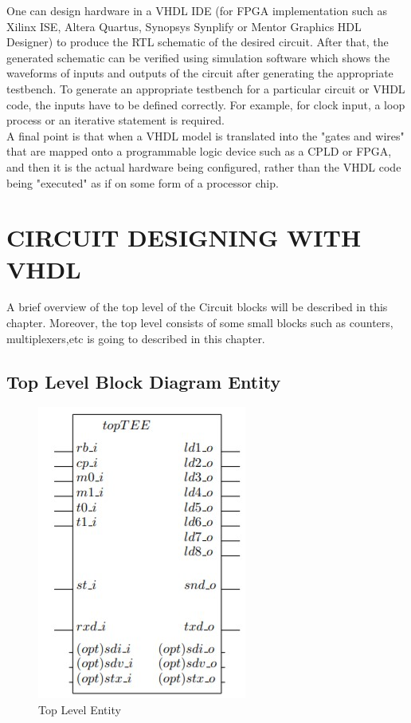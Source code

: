 \documentclass[12pt,a4paper]{article}
\begin{document}
One can design hardware in a VHDL IDE (for FPGA implementation such as Xilinx ISE, Altera Quartus, Synopsys Synplify or Mentor Graphics HDL Designer) to produce the RTL schematic of the desired circuit. After that, the generated schematic can be verified using simulation software which shows the waveforms of inputs and outputs of the circuit after generating the appropriate testbench. To generate an appropriate testbench for a particular circuit or VHDL code, the inputs have to be defined correctly. For example, for clock input, a loop process or an iterative statement is required.\\

A final point is that when a VHDL model is translated into the "gates and wires" that are mapped onto a programmable logic device such as a CPLD or FPGA, and then it is the actual hardware being configured, rather than the VHDL code being "executed" as if on some form of a processor chip.\\





\newpage

\renewcommand{\baselinestretch}{1.5} %
\section{CIRCUIT DESIGNING WITH VHDL}
A brief overview of the top level of the Circuit blocks will be described in this chapter. Moreover, the top level consists of some small blocks such as counters, multiplexers,etc is going to described in this chapter.\\


\subsection{Top Level Block Diagram Entity}

\begin{figure}[H]
\centering
\includegraphics{TopLevelE.JPG}
\caption{Top Level Entity}
\label{Top Level Entity}
\end{figure}
\end{document}
